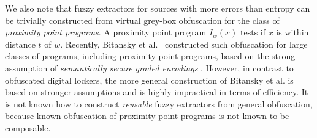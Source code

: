 \documentclass[11pt]{article}
\renewcommand{\paragraph}[1]{\subsubsection{#1}}
\newcommand{\Huse}{\mathrm{H}_{\mathtt{usable}}}
\newcommand{\authnote}[2]{{\textcolor{red}{\textsf{#1 notes: }\textcolor{blue}{ #2}}\marginpar{\textcolor{red}{\textbf{!!!!!}}}}}
\newcommand{\authnote}[2]{}
\newcommand{\bnote}[1]{{\authnote{Ben}{#1}}}
\newcommand{\lnote}[1]{{\authnote{Leo}{#1}}}
\begin{document}
We also note that fuzzy extractors for sources with more errors than entropy can be trivially constructed from virtual grey-box obfuscation for the class of {\em proximity point programs}. A proximity point program $I_w(x)$ tests if $x$ is within distance $t$ of $w$. 
Recently, Bitansky et al.~\cite{BitanskyCKP14} constructed such obfuscation for large classes of programs, including proximity point programs, based on the strong assumption of {\em semantically secure graded encodings} \cite{PassTS13}.
However, in contrast to obfuscated digital lockers, the  more general construction of Bitansky et al. is based on stronger assumptions and is highly impractical in terms of efficiency.  
It is not known how to construct \emph{reusable} fuzzy extractors from general obfuscation, because known obfuscation of proximity point programs is not known to be composable.



\end{document}
